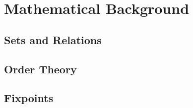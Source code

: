 
\chapter{Mathematical Background}

\section{Sets and Relations}

\section{Order Theory}

\section{Fixpoints}
